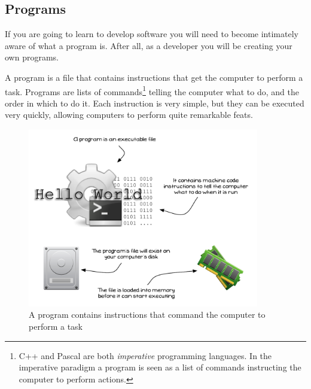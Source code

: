 \clearpage
\subsection{Programs} %
\label{sub:what_is_a_program_}

If you are going to learn to develop software you will need to become intimately aware of what a program is. After all, as a developer you will be creating your own programs.

A program is a file that contains instructions that get the computer to perform a task. Programs are lists of commands\footnote{C++ and Pascal are both \emph{imperative} programming languages. In the imperative paradigm a program is seen as a list of commands instructing the computer to perform actions.} telling the computer what to do, and the order in which to do it. Each instruction is very simple, but they can be executed very quickly, allowing computers to perform quite remarkable feats.

\begin{figure}[h]
   \centering
   \includegraphics[width=0.9\textwidth]{./topics/programs-and-compilers/diagrams/Program} 
   \caption{A program contains instructions that command the computer to perform a task}
   \label{fig:what-is-a-program}
\end{figure}

